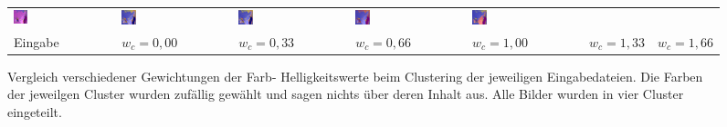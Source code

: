\begin{figure}[h!]
\begin{tabular}{p{}p{}p{}p{}p{}p{}p{}}
		\includegraphics[width=0.14\textwidth]{images/gen/GEN_filterbanks_p03_04_MR_col_0.33.png} &
		\includegraphics[width=0.14\textwidth]{images/gen/GEN_filterbanks_p03_04_MR_col_0.66.png} &
		\includegraphics[width=0.14\textwidth]{images/gen/GEN_filterbanks_p03_04_MR_col_1.0.png} &
		\includegraphics[width=0.14\textwidth]{images/gen/GEN_filterbanks_p03_04_MR_col_1.33.png} &
		\includegraphics[width=0.14\textwidth]{images/gen/GEN_filterbanks_p03_04_MR_col_1.66.png} \\
		
		\hspace{2pt}\newline\centering Eingabe & 
		\hspace{2pt}\newline\centering $w_c=0,00$ &
		\hspace{2pt}\newline\centering $w_c=0,33$ &
		\hspace{2pt}\newline\centering $w_c=0,66$ &
		\hspace{2pt}\newline\centering $w_c=1,00$ &
		\hspace{2pt}\newline\centering $w_c=1,33$ &
		\hspace{2pt}\newline\centering $w_c=1,66$
	\end{tabular}
	\caption{Vergleich verschiedener Gewichtungen der Farb- \bzw Helligkeitswerte beim Clustering der jeweiligen Eingabedateien. Die Farben der jeweilgen Cluster wurden zufällig gewählt und sagen nichts über deren Inhalt aus. Alle Bilder wurden in vier Cluster eingeteilt.}
	\label{fig:filterbank_weights_col}
\end{figure}

